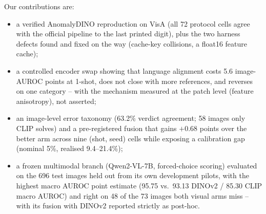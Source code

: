 Our contributions are:
\begin{itemize}
  \item a verified AnomalyDINO reproduction on VisA (all 72 protocol cells agree with the
        official pipeline to the last printed digit), plus the two harness defects found and
        fixed on the way (cache-key collisions, a float16 feature cache);
  \item a controlled encoder swap showing that language alignment costs 5.6 image-AUROC
        points at 1-shot, does not close with more references, and reverses on one category
        -- with the mechanism measured at the patch level (feature anisotropy), not asserted;
  \item an image-level error taxonomy (63.2\% verdict agreement; 58 images only CLIP solves)
        and a pre-registered fusion that gains $+0.68$ points over the better arm across
        nine (shot, seed) cells while exposing a calibration gap (nominal 5\%, realised
        9.4--21.4\%);
  \item a frozen multimodal branch (Qwen2-VL-7B, forced-choice scoring) evaluated on the 696
        test images held out from its own development pilots, with the highest macro AUROC point estimate
        (95.75 vs.\ 93.13 DINOv2 / 85.30 CLIP macro AUROC) and right on 48 of the 73 images
        both visual arms miss -- with its fusion with DINOv2 reported strictly as post-hoc.
\end{itemize}
